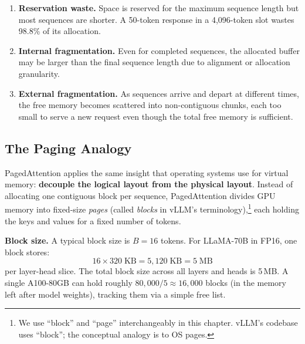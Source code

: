%
\begin{enumerate}
  \item \textbf{Reservation waste.} Space is reserved for the maximum sequence length but most sequences are shorter. A 50-token response in a 4,096-token slot wastes 98.8\% of its allocation.
  \item \textbf{Internal fragmentation.} Even for completed sequences, the allocated buffer may be larger than the final sequence length due to alignment or allocation granularity.
  \item \textbf{External fragmentation.} As sequences arrive and depart at different times, the free memory becomes scattered into non-contiguous chunks, each too small to serve a new request even though the total free memory is sufficient.
\end{enumerate}

\subsection{The Paging Analogy}

PagedAttention applies the same insight that operating systems use for virtual memory: \textbf{decouple the logical layout from the physical layout}. Instead of allocating one contiguous block per sequence, PagedAttention divides GPU memory into fixed-size \emph{pages} (called \emph{blocks} in vLLM's terminology),\footnote{We use ``block'' and ``page'' interchangeably in this chapter. vLLM's codebase uses ``block''; the conceptual analogy is to OS pages.} each holding the keys and values for a fixed number of tokens.

\begin{notebox}
\textbf{Block size.} A typical block size is $B = 16$ tokens. For LLaMA-70B in FP16, one block stores:
\[
16 \times 320\;\text{KB} = 5{,}120\;\text{KB} = 5\;\text{MB}
\]
per layer-head slice. The total block size across all layers and heads is 5\,MB. A single A100-80GB can hold roughly $80{,}000 / 5 \approx 16{,}000$ blocks (in the memory left after model weights), tracking them via a simple free list.
\end{notebox}

